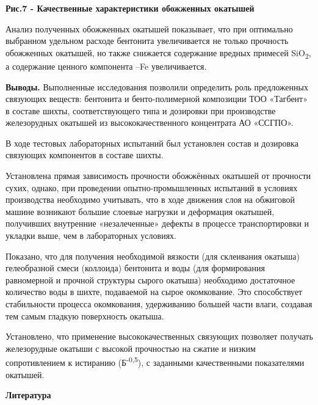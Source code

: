 {\bfseries Рис.7 - Качественные характеристики обожженных окатышей}

\begin{multicols}{2}
Анализ полученных обожженных окатышей показывает, что при оптимально
выбранном удельном расходе бентонита увеличивается не только прочность
обожженных окатышей, но также снижается содержание вредных примесей
SiO\textsubscript{2}, а содержание ценного компонента --Fe
увеличивается.

{\bfseries Выводы.} Выполненные исследования позволили определить роль
предложенных связующих веществ: бентонита и бенто-полимерной композиции
ТОО «Тагбент» в составе шихты, соответствующего типа и дозировки при
производстве железорудных окатышей из высококачественного концентрата АО
«ССГПО».

В ходе тестовых лабораторных испытаний был установлен состав и дозировка
связующих компонентов в составе шихты.

Установлена прямая зависимость прочности обожжённых окатышей от
прочности сухих, однако, при проведении опытно-промышленных испытаний в
условиях производства необходимо учитывать, что в ходе движения слоя на
обжиговой машине возникают большие слоевые нагрузки и деформация
окатышей, получивших внутренние «незалеченные» дефекты в процессе
транспортировки и укладки выше, чем в лабораторных условиях.

Показано, что для получения необходимой вязкости (для склеивания
окатыша) гелеобразной смеси (коллоида) бентонита и воды (для
формирования равномерной и прочной структуры сырого окатыша) необходимо
достаточное количество воды в шихте, подаваемой на сырое окомкование.
Это способствует стабильности процесса окомкования, удерживанию большей
части влаги, создавая тем самым гладкую поверхность окатыша.

Установлено, что применение высококачественных связующих позволяет
получать железорудные окатыши с высокой прочностью на сжатие и низким
сопротивлением к истиранию (Б\textsuperscript{-0,5}), с заданными
качественными показателями окатышей.
\end{multicols}

\begin{center}
{\bfseries Литература}
\end{center}

